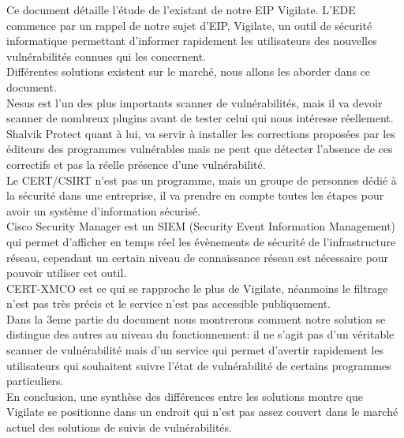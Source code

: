 Ce document détaille l'étude de l'existant de notre EIP Vigilate. L'EDE commence par un rappel de notre sujet d'EIP, Vigilate, un outil de sécurité informatique permettant d'informer rapidement les utilisateurs des nouvelles vulnérabilités connues qui les concernent.\\
Différentes solutions existent sur le marché, nous allons les aborder dans ce document.\\
Nesus est l’un des plus importants scanner de vulnérabilités, mais il va devoir scanner de nombreux plugins avant de tester celui qui nous intéresse réellement.\\
Shalvik Protect quant à lui, va servir à installer les corrections proposées par les éditeurs des programmes vulnérables mais ne peut que détecter l’absence de ces correctifs et pas la réelle présence d’une vulnérabilité.\\
Le CERT/CSIRT n’est pas un programme, mais un groupe de personnes dédié à la sécurité dans une entreprise, il va prendre en compte toutes les étapes pour avoir un système d’information sécurisé.\\
Cisco Security Manager est un SIEM (Security Event Information Management) qui permet d’afficher en temps réel les évènements de sécurité de l'infrastructure réseau, cependant un certain niveau de connaissance réseau est nécessaire pour pouvoir utiliser cet outil.\\
CERT-XMCO est ce qui se rapproche le plus de Vigilate, néanmoins le filtrage n’est pas très précis et le service n’est pas accessible publiquement.\\
Dans la 3eme partie du document nous montrerons comment notre solution se distingue des autres au niveau du fonctionnement: il ne s’agit pas d’un véritable scanner de vulnérabilité mais d’un service qui permet d’avertir rapidement les utilisateurs qui souhaitent suivre l’état de vulnérabilité de certains programmes particuliers.\\
En conclusion, une synthèse des différences entre les solutions montre que Vigilate se positionne dans un endroit qui n’est pas assez couvert dans le marché actuel des solutions de suivis de vulnérabilités.\\